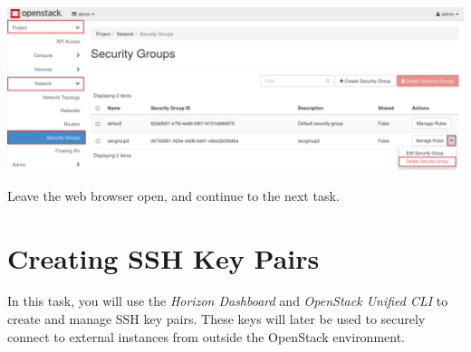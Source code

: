 \documentclass[letterpaper, 12pt]{article}
\begin{document}
\begin{enumerate}
\begin{labstep}
        \begin{center}
            \includegraphics[width=\linewidth]{images/part2/step23.png}
        \end{center}
    \end{labstep}

    \begin{labstep}
        Leave the web browser open, and continue to the next task.
    \end{labstep}

\end{enumerate}

\section{Creating SSH Key Pairs}\label{sec:creating-ssh-key-pairs}
In this task, you will use the \textit{Horizon Dashboard} and \textit{OpenStack Unified CLI} to create and manage SSH key pairs.
These keys will later be used to securely connect to external instances from outside the OpenStack environment.
\end{document}
